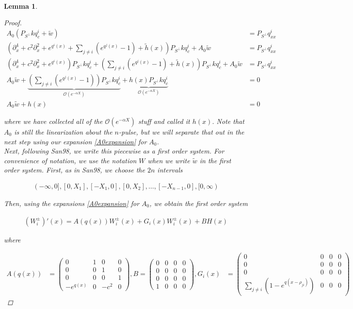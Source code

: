 \documentclass[12pt]{article}
\newtheorem{lemma}{Lemma}
\begin{document}
\begin{lemma}
\begin{proof}
\begin{align*}
A_0 (P_{S^\perp} k q^i_c + \tilde{w}) &= P_{S^\perp} q^i_{xx} \\
\left(\partial_x^4 + c^2 \partial_x^2 + e^{q^i(x)} + \sum_{j \neq i} (e^{q^j(x)} - 1) + \tilde{h}(x) \right)P_{S^\perp} k q^i_c + A_0 \tilde{w} &= P_{S^\perp} q^i_{xx} \\
(\partial_x^4 + c^2 \partial_x^2 + e^{q^i(x)})P_{S^\perp} k q^i_c + \left( \sum_{j \neq i} (e^{q^j(x)} - 1)+ \tilde{h}(x) \right) P_{S^\perp}k q^i_c + A_0 \tilde{w} &= P_{S^\perp} q^i_{xx} \\
A_0 \tilde{w} + \underbrace{\left( \sum_{j \neq i} (e^{q^j(x)} - 1)\right) P_{S^\perp} k q^i_c}_{\mathcal{O}(e^{-\alpha X})} 
+ \underbrace{h(x) P_{S^\perp}k q^i_c}_{\mathcal{O}(e^{-\alpha X})} &= 0 \\
A_0 \tilde{w} + h(x) &= 0
\end{align*}

where we have collected all of the $\mathcal{O}(e^{-\alpha X})$ stuff and called it $h(x)$. Note that $A_0$ is still the linearization about the $n$-pulse, but we will separate that out in the next step using our expansion \eqref{A0expansion} for $A_0$.\\

Next, following San98, we write this piecewise as a first order system. For convenience of notation, we use the notation $W$ when we write $\tilde{w}$ in the first order system. First, as in San98, we choose the $2n$ intervals 

\begin{align*}
(-\infty, 0], [0, X_1], [-X_1, 0], [0, X_2], \dots, [-X_{n-1}, 0], [0, \infty)
\end{align*}

Then, using the expansions \eqref{A0expansion} for $A_0$, we obtain the first order system

\begin{align*}
(W_i^\pm)'(x) = A(q(x)) W_i^\pm(x) + G_i(x) W_i^\pm(x) + B H(x)
\end{align*}

where

\begin{align*}
A(q(x)) &= \begin{pmatrix}
0 & 1 & 0 & 0 \\
0 & 0 & 1 & 0 \\
0 & 0 & 0 & 1 \\
-e^{q(x)} & 0 & -c^2 & 0 
\end{pmatrix},
B = \begin{pmatrix}
0 & 0 & 0 & 0 \\
0 & 0 & 0 & 0 \\
0 & 0 & 0 & 0 \\
1 & 0 & 0 & 0 
\end{pmatrix},
G_i(x) &= \begin{pmatrix}
0 & 0 & 0 & 0 \\
0 & 0 & 0 & 0 \\
0 & 0 & 0 & 0 \\
\sum_{j \neq i} (1 - e^{q(x - \rho_{ji})}) & 0 & 0 & 0 
\end{pmatrix}
\end{align*}


\end{proof}
\end{lemma}
\end{document}
